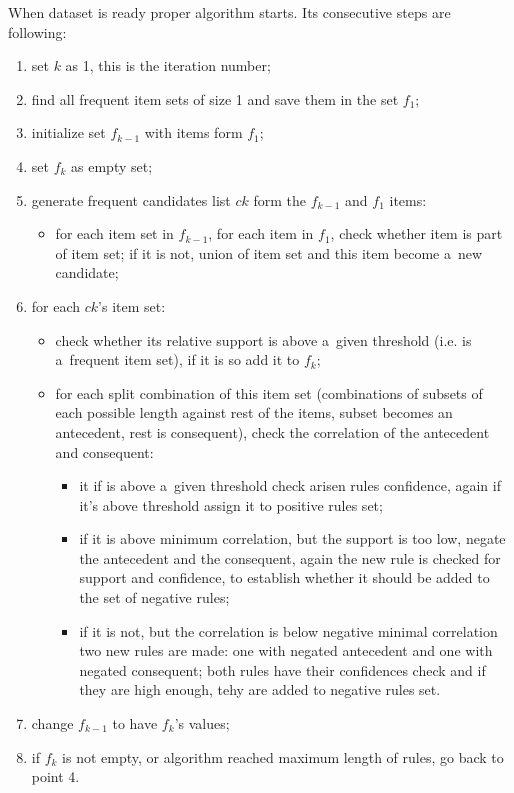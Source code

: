 \documentclass{article}
\begin{document}
	When dataset is ready proper algorithm starts. Its consecutive steps are following:
	\begin{enumerate}
		\item set $k$ as 1, this is the iteration number;
		\item find all frequent item sets of size 1 and save them in the set $f_{1}$;
		\item initialize set $f_{k-1}$ with items form $f_{1}$;
		\item set $f_{k}$ as empty set;
		\item generate frequent candidates list $ck$ form the $f_{k-1}$ and $f_{1}$ items:
		\begin{itemize}
			\item for each item set in $f_{k-1}$, for each item in $f_{1}$, check whether item is part of item set; if it is not, union of item set and this item become a~new candidate;
		\end{itemize}
		\item for each $ck$'s item set:
		\begin{itemize}
			\item check whether its relative support is above a~given threshold (i.e. is a~frequent item set), if it is so add it to $f_{k}$;
			\item for each split combination of this item set (combinations of subsets of each possible length against rest of the items, subset becomes an antecedent, rest is consequent), check the correlation of the antecedent and consequent:
			\begin{itemize}
				\item it if is above a~given threshold check arisen rules confidence, again if it's above threshold assign it to positive rules set;
				\item if it is above minimum correlation, but the support is too low, negate the antecedent and the consequent, again the new rule is checked for support and confidence, to establish whether it should be added to the set of negative rules;
				\item if it is not, but the correlation is below negative minimal correlation two new rules are made: one with negated antecedent and one with negated consequent; both rules have their confidences check and if they are high enough, tehy are added to negative rules set.
			\end{itemize}			
		\end{itemize}
		\item change $f_{k-1}$ to have $f_{k}$'s values;
		\item if $f_{k}$ is not empty, or algorithm reached maximum length of rules, go back to point 4.
	\end{enumerate}
	
	
 	
\end{document}
